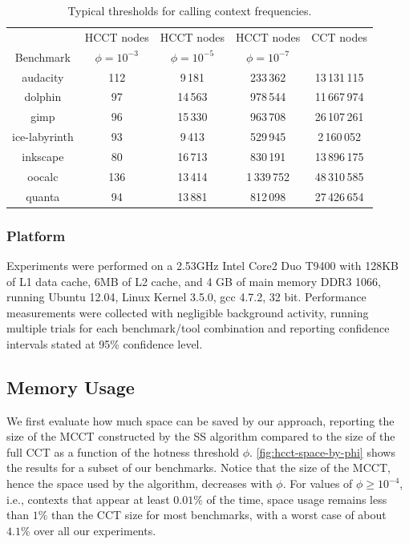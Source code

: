 \begin{table}[ht]
\vspace{2mm}
\begin{center}
\begin{tabular}{c c c c c}
\hline
  & HCCT nodes  & HCCT nodes & HCCT nodes & CCT nodes \\ 
Benchmark & $\phi=10^{-3}$  & $\phi=10^{-5}$ & $\phi=10^{-7}$ \\ 
\hline
audacity & 112 & 9\,181 & 233\,362 & 13\,131\,115 \\
dolphin & 97 & 14\,563 & 978\,544 & 11\,667\,974 \\
gimp & 96 & 15\,330 & 963\,708 & 26\,107\,261 \\
ice-labyrinth & 93 & 9\,413 & 529\,945 & 2\,160\,052 \\
inkscape & 80 & 16\,713 & 830\,191 & 13\,896\,175 \\
oocalc & 136 & 13\,414 & 1\,339\,752 & 48\,310\,585 \\
quanta & 94 & 13\,881 & 812\,098 & 27\,426\,654 \\
\hline
\end{tabular}
\vspace{3mm}
\caption{\label{tab:hcct-phi} Typical thresholds for calling context frequencies.}
\end{center}
\end{table}
\ifauthorea{\newline}{}

\subsubsection*{Platform}

Experiments were performed on a 2.53GHz Intel Core2 Duo T9400 with 128KB of L1 data cache, 6MB of L2 cache, and 4 GB of main memory DDR3 1066, running Ubuntu 12.04, Linux Kernel 3.5.0, gcc 4.7.2, 32 bit. Performance measurements were collected with negligible background activity, running multiple trials for each benchmark/tool combination and reporting confidence intervals stated at 95\% confidence level.

\subsection{Memory Usage}
\label{ss:eval-hcct-memory}

We first evaluate how much space can be saved by our approach, reporting the size of the MCCT constructed by the SS algorithm compared to the size of the full CCT as a function of the hotness threshold $\phi$. \myfigure\ref{fig:hcct-space-by-phi} shows the results for a subset of our benchmarks. Notice that the size of the MCCT, hence the space used by the algorithm, decreases with $\phi$. For values of $\phi\ge 10^{-4}$, i.e., contexts that appear at least $0.01\%$ of the time, space usage remains less than $1\%$ than the CCT size for most benchmarks, with a worst case of about $4.1\%$ over all our experiments.

